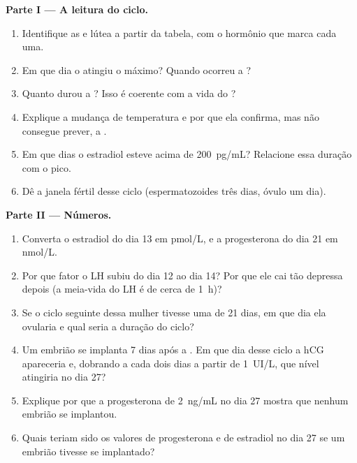 \begin{problem}
\medskip
\noindent\textbf{Parte I --- A leitura do ciclo.}
\begin{enumerate}
  \item Identifique as  e lútea a partir da tabela, com
        o hormônio que marca cada uma.
  \item Em que dia o  atingiu o máximo? Quando ocorreu a
        ?
  \item Quanto durou a ? Isso é coerente com a vida do ?
  \item Explique a mudança de temperatura e por que ela confirma, mas
        não consegue prever, a .
  \item Em que dias o estradiol esteve acima de \qty{200}{pg/mL}?
        Relacione essa duração com o pico.
  \item Dê a janela fértil desse ciclo (espermatozoides três dias,
        óvulo um dia).
\end{enumerate}

\medskip
\noindent\textbf{Parte II --- Números.}
\begin{enumerate}[resume]
  \item Converta o estradiol do dia 13 em \unit{pmol/L}, e a
        progesterona do dia 21 em \unit{nmol/L}.
  \item Por que fator o LH subiu do dia 12 ao dia 14? Por que ele cai
        tão depressa depois (a meia-vida do LH é de cerca de
        \qty{1}{h})?
  \item Se o ciclo seguinte dessa mulher tivesse uma  de
        21 dias, em que dia ela ovularia e qual seria a duração do
        ciclo?
  \item Um embrião se implanta 7 dias após a . Em que dia desse
        ciclo a hCG apareceria e, dobrando a cada dois dias a partir de
        \qty{1}{UI/L}, que nível atingiria no dia 27?
  \item Explique por que a progesterona de \qty{2}{ng/mL} no dia 27
        mostra que nenhum embrião se implantou.
  \item Quais teriam sido os valores de progesterona e de estradiol no
        dia 27 se um embrião tivesse se implantado?
\end{enumerate}


\end{problem}
